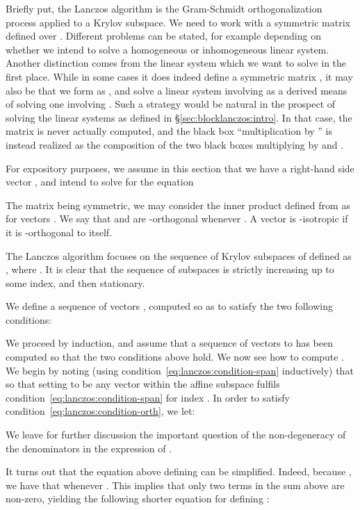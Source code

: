 Briefly put, the Lanczos algorithm is the Gram-Schmidt orthogonalization
process applied to a Krylov subspace. We need to work with a symmetric
matrix  defined over .  Different problems can be stated, for
example depending on whether we intend to solve a homogeneous or
inhomogeneous linear system. Another distinction comes from the linear
system which we want to solve in the first place. While in some cases it
does indeed define a symmetric matrix , it may also be that we form
 as , and solve a linear system involving  as a derived
means of solving one involving . Such a strategy would be natural in
the prospect of solving the linear systems as defined in
§\ref{sec:blocklanczos:intro}. In that case, the matrix  is never actually
computed, and the black box ``multiplication by '' is instead realized
as the composition
of the two black boxes multiplying by  and .

For expository purposes, we assume in
this section that we have a right-hand side vector ,
and intend to solve for  the equation


The matrix  being symmetric, we may consider
the inner product defined from  as  for 
vectors . We say that  and  are -orthogonal
whenever . A vector is -isotropic if it is -orthogonal to
itself.

The Lanczos algorithm focuses on the sequence of Krylov subspaces of 
defined as ,
where .
It is clear that the sequence of subspaces
 is
strictly increasing up to some index, and then stationary.

We define a sequence of vectors , 
computed so as to satisfy the two following conditions:

We proceed by induction, and assume that a sequence of vectors  to
 has been computed so that the two conditions above hold.
We now see how to compute .
We begin by noting (using condition~\eqref{eq:lanczos:condition-span}
inductively) that 
so
that setting  to be any vector within the affine subspace
 fulfils condition~\eqref{eq:lanczos:condition-span} for
index . In
order to satisfy condition~\eqref{eq:lanczos:condition-orth}, we let:

We leave for further discussion the important question of the
non-degeneracy of the denominators in the expression of .

It turns out that the equation above defining  can be
simplified.
Indeed, because , we have that
 whenever . This implies that only two terms in
the sum above are non-zero, yielding the following shorter equation for
defining :

